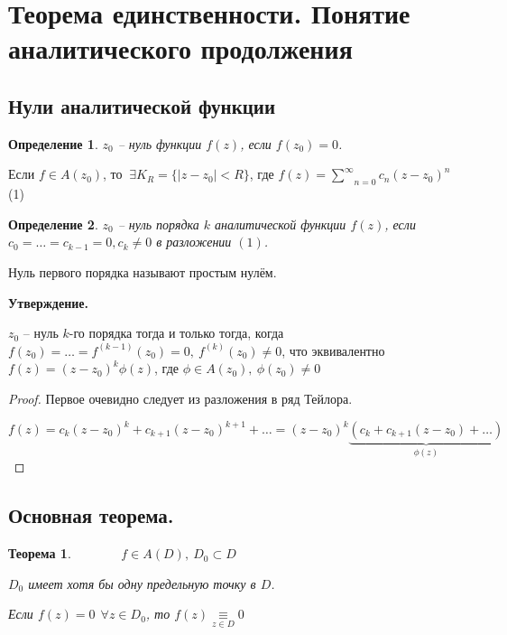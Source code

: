 \documentclass[final]{report}
\newcommand{\forcenewline}{$\phantom{\mbox{newline}}$\newline}
\newcommand{\msum}[2]{\underset{#1}{\overset{#2}{\sum}}}
\newcommand{\ssum}{\msum{n=0}{\infty}}
\renewcommand{\f}{\phi}
\newcommand{\E}{\ \exists}
\newcommand{\F}{\ \forall}
\newcommand{\opr}[1]{\begin{opred}#1\end{opred}}
\newtheorem*{theor}{Теорема}
\newtheorem*{opred}{Определение}
\theoremstyle{remark}
\begin{document}
\newpage

\section{Теорема единственности. Понятие аналитического продолжения}

\subsection{Нули аналитической функции}

\opr{$z_0$ -- нуль функции $f(z)$, если $f(z_0)=0$.}

Если $f\in A(z_0)$, то $\E K_R=\{|z-z_0|<R\}$, где $f(z)=\ssum c_n(z-z_0)^n$ (1)

\opr{$z_0$ -- нуль порядка $k$ аналитической функции $f(z)$, если $c_0=\ldots=c_{k-1}=0,c_k\neq0$ в разложении $(1)$.}

Нуль первого порядка называют простым нулём.

{\bfseries Утверждение.}

$z_0$ -- нуль $k$-го порядка тогда и только тогда, когда $f(z_0)=\ldots=f^{(k-1)}(z_0)=0,\ f^{(k)}(z_0)\neq 0$, что эквивалентно $f(z)=(z-z_0)^k\f(z)$, где $\f\in A(z_0),\ \f(z_0)\neq0$
\begin{proof}
Первое очевидно следует из разложения в ряд Тейлора.

$f(z)=c_k(z-z_0)^k+c_{k+1}(z-z_0)^{k+1}+\ldots=(z-z_0)^k\underset{\f(z)}{\underbrace{(c_k+c_{k+1}(z-z_0)+\ldots)}}$
\end{proof}

\subsection{Основная теорема.}

\begin{theor}
\forcenewline
$f\in A(D),\ D_0\subset D$

$D_0$ имеет хотя бы одну предельную точку в $D$.

Если $f(z)=0\ \F z\in D_0$, то $f(z)\underset{z\in D}{\equiv}0$
\end{theor}
\end{document}
